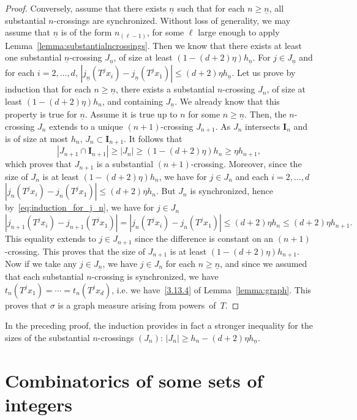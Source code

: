 \documentclass[AHL,Unicode,longabstracts]{cedram}
\newcommand{\nb}{\underline{n}}
\newcommand{\ci}{\boldsymbol I}
\begin{document}
\begin{proof}
Conversely, assume that there exists $\nb$ such that for each $n\ge\nb$, all substantial $n$-crossings are synchronized. Without loss of generality, we may assume that $\nb$ is of the form $n_{(\ell-1)}$, for some $\ell$ large enough to apply Lemma~\ref{lemma:substantialncrossings}. Then we know that there exists at least one substantial $\nb$-crossing $J_{\nb}$, of size at least $(1-(d+2)\eta)h_{\nb}$. For $j\in J_{\nb}$ and for each $i=2,\ldots,d$, $|j_{\nb}(T^j x_i)-j_{\nb}(T^j x_1)|\le (d+2)\eta h_{\nb}$. Let us prove by induction that for each $n\ge\nb$, there exists a substantial $n$-crossing $J_n$, of size at least $(1-(d+2)\eta)h_n$, and containing $J_{\nb}$. We already know that this property is true for $\nb$. Assume it is true up to $n$ for some $n\ge\nb$. Then, the $n$-crossing $J_n$ extends to a unique $(n+1)$-crossing $J_{n+1}$. As $J_n$ intersects $\ci_n$ and is of size at most $h_n$, $J_n\subset \ci_{n+1}$. It follows that
\[
\left|J_{n+1}\cap \ci_{n+1}\right| \ge \left| J_n \right| \ge (1-(d+2)\eta)h_n \ge \eta h_{n+1},
\]
which proves that $J_{n+1}$ is a substantial $(n+1)$-crossing. Moreover, since the size of $J_n$ is at least $(1-(d+2)\eta)h_n$, we have for $j\in J_n$ and each $i=2,\ldots,d$ $|j_n(T^j x_i)-j_n(T^j x_1)|\le (d+2)\eta h_{n}$. But $J_n$ is synchronized, hence by~\eqref{eq:induction_for_j_n}, we have for $j\in J_n$
\[
|j_{n+1}(T^j x_i)-j_{n+1}(T^j x_1)| = |j_n(T^j x_i)-j_n(T^j x_1)| \le (d+2)\eta h_{n} \le (d+2)\eta h_{n+1}.
\]
This equality extends to $j\in J_{n+1}$ since the difference is constant on an $(n+1)$-crossing. This proves that the size of $J_{n+1}$ is at least $(1-(d+2)\eta)h_{n+1}$. Now if we take any $j\in J_{\nb}$, we have $j\in J_n$ for each $n\ge\nb$, and since we assumed that each substantial $n$-crossing is synchronized, we have $t_n(T^jx_1)=\cdots=t_n(T^jx_d)$, i.e. we have~\eqref{3.13.4} of Lemma~\ref{lemma:graph}. This proves that $\sigma$ is a graph measure arising from powers~of~$T$.
\end{proof}

\begin{rema}\label{remark:sizes}
In the preceding proof, the induction provides in fact a stronger inequality for the sizes of the substantial $n$-crossings $(J_n)$: $|J_n|\ge h_n-(d+2)\eta h_{\nb}$.
\end{rema}


\section{Combinatorics of some sets of integers}\label{sec:combinatorics}
\end{document}
